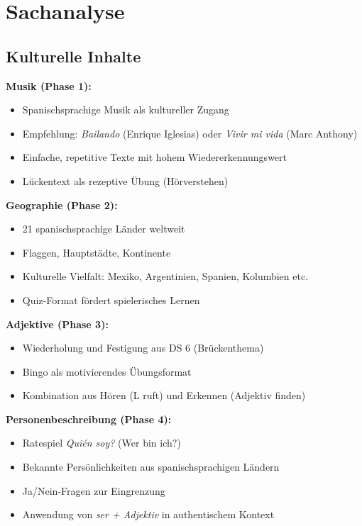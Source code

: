 \documentclass[11pt,a4paper]{article}
\begin{document}
\section{Sachanalyse}

\subsection{Kulturelle Inhalte}

\textbf{Musik (Phase 1):}
\begin{itemize}
    \item Spanischsprachige Musik als kultureller Zugang
    \item Empfehlung: \textit{\glqq{}Bailando\grqq{}} (Enrique Iglesias) oder \textit{\glqq{}Vivir mi vida\grqq{}} (Marc Anthony)
    \item Einfache, repetitive Texte mit hohem Wiedererkennungswert
    \item Lückentext als rezeptive Übung (Hörverstehen)
\end{itemize}

\textbf{Geographie (Phase 2):}
\begin{itemize}
    \item 21 spanischsprachige Länder weltweit
    \item Flaggen, Hauptstädte, Kontinente
    \item Kulturelle Vielfalt: Mexiko, Argentinien, Spanien, Kolumbien etc.
    \item Quiz-Format fördert spielerisches Lernen
\end{itemize}

\textbf{Adjektive (Phase 3):}
\begin{itemize}
    \item Wiederholung und Festigung aus DS 6 (Brückenthema)
    \item Bingo als motivierendes Übungsformat
    \item Kombination aus Hören (L ruft) und Erkennen (Adjektiv finden)
\end{itemize}

\textbf{Personenbeschreibung (Phase 4):}
\begin{itemize}
    \item Ratespiel \textit{\glqq{}\textquestiondown{}Quién soy?\grqq{}} (Wer bin ich?)
    \item Bekannte Persönlichkeiten aus spanischsprachigen Ländern
    \item Ja/Nein-Fragen zur Eingrenzung
    \item Anwendung von \textit{ser + Adjektiv} in authentischem Kontext
\end{itemize}
\end{document}
